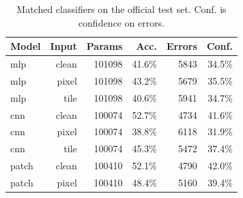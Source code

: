\begin{table}[ht]\centering\small
\caption{Matched classifiers on the official test set. Conf. is confidence on errors.}\label{tab:class}
\begin{tabular}{lrrrrr}
\toprule
Model & Input & Params & Acc. & Errors & Conf.\\
\midrule
mlp & clean & 101098 & 41.6\% & 5843 & 34.5\%\\
mlp & pixel & 101098 & 43.2\% & 5679 & 35.5\%\\
mlp & tile & 101098 & 40.6\% & 5941 & 34.7\%\\
cnn & clean & 100074 & 52.7\% & 4734 & 41.6\%\\
cnn & pixel & 100074 & 38.8\% & 6118 & 31.9\%\\
cnn & tile & 100074 & 45.3\% & 5472 & 37.4\%\\
patch & clean & 100410 & 52.1\% & 4790 & 42.0\%\\
patch & pixel & 100410 & 48.4\% & 5160 & 39.4\%\\
\bottomrule\end{tabular}
\end{table}